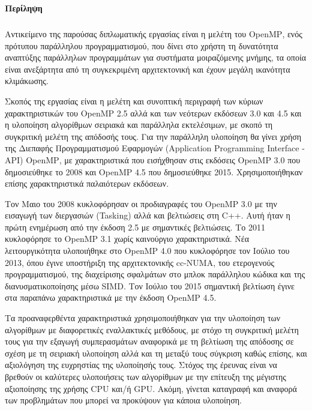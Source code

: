 \documentclass[12pt]{article}
\newcommand{\en}[1]{\foreignlanguage{english}{#1}}
\begin{document}

\clearpage
\begin{small}
\vfil
\end{small}



\clearpage
\begin{flushleft}
{\large \textbf{Περίληψη}}\\[0.5 cm]
\end{flushleft}

\subparagraph{}
Αντικείμενο της παρούσας διπλωματικής εργασίας είναι η μελέτη του \en{OpenMP}, ενός πρότυπου παράλληλου προγραμματισμού, που δίνει στο χρήστη τη δυνατότητα αναπτύξης παράλληλων προγραμμάτων για συστήματα μοιραζόμενης μνήμης, τα οποία  είναι ανεξάρτητα από τη συγκεκριμένη αρχιτεκτονική και έχουν μεγάλη ικανότητα κλιμάκωσης\cite{pdplab}.

Σκοπός της εργασίας είναι η μελέτη και συνοπτική περιγραφή των κύριων χαρακτηριστικών του \en{OpenMP 2.5} αλλά και των νεότερων εκδόσεων 3.0 και 4.5 και η υλοποίηση αλγορίθμων σειριακά και παράλληλα εκτελέσιμων, με σκοπό τη συγκριτική μελέτη της απόδοσής τους. Για την παράλληλη υλοποίηση θα γίνει χρήση της Διεπαφής Προγραμματισμού Εφαρμογών \en{(Application Programming Interface {-} API) OpenMP}, με χαρακτηριστικά που εισήχθησαν στις εκδόσεις \en{OpenMP} 3.0 που δημοσιεύθηκε το 2008 και \en{OpenMP} 4.5 που δημοσιεύθηκε 2015. Χρησιμοποιήθηκαν επίσης χαρακτηριστικά παλαιότερων εκδόσεων\cite{thenextstep59}.

Τον Μαιο του 2008 κυκλοφόρησαν οι προδιαγραφές του \en{OpenMP} 3.0 με την εισαγωγή των διεργασιών \en{(Tasking)} αλλά και βελτιώσεις στη \en{C++}. Αυτή ήταν η πρώτη ενημέρωση από την έκδοση 2.5 με σημαντικές βελτιώσεις. Το 2011 κυκλοφόρησε το \en{OpenMP} 3.1 χωρίς καινούργιο χαρακτηριστικά. Νέα λειτουργικότητα υλοποιήθηκε στο \en{OpenMP} 4.0 που κυκλοφόρησε τον Ιούλιο του 2013, όπου έγινε υποστήριξη της αρχιτεκτονικής \en{cc-NUMA}, του ετερογενούς προγραμματισμού, της διαχείρισης σφαλμάτων στο μπλοκ παράλληλου κώδικα και της διανυσματικοποίησης μέσω \en{SIMD}. Τον Ιούλιο του 2015 σημαντική βελτίωση έγινε στα παραπάνω χαρακτηριστικά με την έκδοση \en{OpenMP} 4.5\cite{thenextstep20}.

Τα προαναφερθέντα χαρακτηριστικά χρησιμοποιήθηκαν για την υλοποίηση των αλγορίθμων 
με διαφορετικές εναλλακτικές μεθόδους, με στόχο τη συγκριτική μελέτη τους για την εξαγωγή συμπερασμάτων αναφορικά με τη βελτίωση της απόδοσης σε σχέση με τη σειριακή υλοποίηση αλλά και τη μεταξύ τους σύγκριση καθώς επίσης, και αξιολόγηση της ευχρηστίας της υλοποίησής τους. Στόχος της έρευνας είναι να βρεθούν οι καλύτερες υλοποιήσεις των αλγορίθμων με την επίτευξη της μέγιστης αξιοποίησης της χρήσης \en{CPU} και/ή \en{GPU}. Ακόμη, γίνεται καταγραφή και αναφορά των προβλημάτων που μπορεί να προκύψουν για κάποια υλοποίηση.
\end{document}
